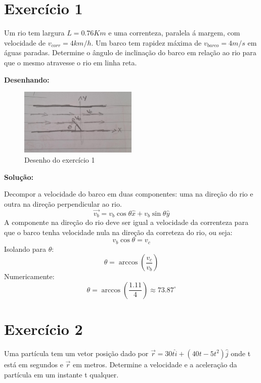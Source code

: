 \documentclass[12pt, a4paper]{article} %
\begin{document}
\section{Exerc\'icio 1}
{        Um rio tem largura $L=0.76Km$ e uma correnteza, paralela \'a margem, com velocidade de $v_{corr}=4km/h$. Um barco tem rapidez m\'axima de $v_{barco}=4m/s$ em \'aguas paradas. Determine o \^angulo de inclina\c{c}\~ao do barco em rela\c{c}\~ao ao rio para que o mesmo atravesse o rio em linha reta.

    \textbf{Desenhando:}

    \begin{figure}[H]
        \centering
        \includegraphics[width=0.5\textwidth]{imagens/ex1.jpeg}
        \caption{Desenho do exerc\'icio 1}
        \label{fig:ex1}
        
    \end{figure}

    \textbf{Solu\c{c}\~ao:}

    Decompor a velocidade do barco em duas componentes: uma na dire\c{c}\~ao do rio e outra na dire\c{c}\~ao perpendicular ao rio.
    \begin{equation}
        \overrightarrow{v_{b}}  = v_{b}\cos\theta \hat{x} + v_{b}\sin\theta \hat{y} 
    \end{equation}
    A componente na dire\c{c}\~ao do rio deve ser igual a velocidade da correnteza para que o barco tenha velocidade nula na dire\c{c}\~ao da correteza do rio, ou seja:
    \begin{equation}
        v_{b}\cos\theta = v_{c}
    \end{equation}
    Isolando para $\theta$:
    \begin{equation}
        \theta = \arccos\left(\frac{v_{c}}{v_{b}}\right)
    \end{equation}
    Numericamente:
    \begin{equation}
        \theta = \arccos\left(\frac{1.11}{4}\right) \approx 73.87^{\circ}
    \end{equation}}


    
\section{Exerc\'icio 2}
    Uma part\'icula tem um vetor posi\c{c}\~ao dado por $\overrightarrow{r} = 30t \hat{i} + (40t - 5t^{2}) \hat{j}$ onde t est\'a em segundos e $\overrightarrow{r}$ em metros. Determine a velocidade e a acelera\c{c}\~ao da part\'icula em um instante t qualquer.
\end{document}

